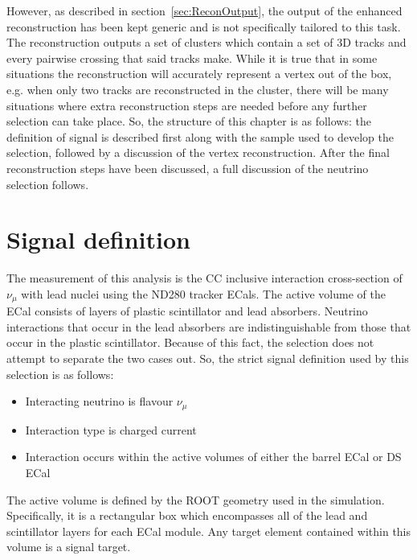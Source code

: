 However, as described in section~\ref{sec:ReconOutput}, the output of the enhanced reconstruction has been kept generic and is not specifically tailored to this task.  The reconstruction outputs a set of clusters which contain a set of 3D tracks and every pairwise crossing that said tracks make.  While it is true that in some situations the reconstruction will accurately represent a vertex out of the box, e.g. when only two tracks are reconstructed in the cluster, there will be many situations where extra reconstruction steps are needed before any further selection can take place.  So, the structure of this chapter is as follows: the definition of signal is described first along with the sample used to develop the selection, followed by a discussion of the vertex reconstruction.  After the final reconstruction steps have been discussed, a full discussion of the neutrino selection follows.

\section{Signal definition}
\label{sec:SignalDefinition}
The measurement of this analysis is the CC inclusive interaction cross-section of $\nu_\mu$ with lead nuclei using the ND280 tracker ECals.  The active volume of the ECal consists of layers of plastic scintillator and lead absorbers.  Neutrino interactions that occur in the lead absorbers are indistinguishable from those that occur in the plastic scintillator.  Because of this fact, the selection does not attempt to separate the two cases out.  So, the strict signal definition used by this selection  is as follows:
\begin{itemize}
  \item Interacting neutrino is flavour $\nu_\mu$
  \item Interaction type is charged current
  \item Interaction occurs within the active volumes of either the barrel ECal or DS ECal
\end{itemize}
The active volume is defined by the ROOT geometry used in the simulation.  Specifically, it is a rectangular box which encompasses all of the lead and scintillator layers for each ECal module.  Any target element contained within this volume is a signal target.

